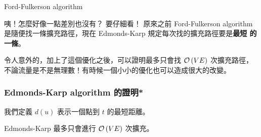 \documentclass[a4paper,12pt]{book}
\begin{document}
\begin{algorithm}[H]
  \DontPrintSemicolon
  \caption{Ford-Fulkerson algorithm}\label{euclid}
  \myalg{\FF{}} {
}
\end{algorithm}
咦！怎麼好像一點差別也沒有？ 要仔細看！ 原來之前 Ford-Fulkerson algorithm
是隨便找一條擴充路徑，現在 Edmonds-Karp 規定每次找的擴充路徑要是{\bf 最短
  的一條}。

令人意外的，加上了這個優化之後，可以證明最多只會找 $\operatorname{\mathcal{O}}\left(VE\right)$ 次擴充路徑，
不論流量是不是無理數！有時候一個小小的優化也可以造成很大的改變。

\subsubsection{Edmonds-Karp algorithm 的證明*}
\begin{definition}
  我們定義 $d(u)$ 表示一個點到 $t$ 的最短距離。
\end{definition}
\begin{theorem}
  Edmonds-Karp 最多只會進行 $\operatorname{\mathcal{O}}\left(VE\right)$ 次擴充。
\end{theorem}
\end{document}
